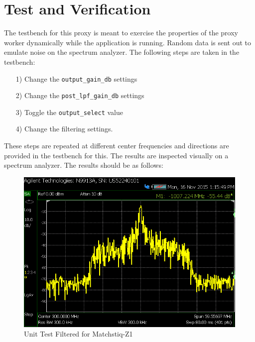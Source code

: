 \documentclass{article}
\begin{document}
\section*{Test and Verification}
\begin{flushleft}
	The testbench for this proxy is meant to exercise the properties of the proxy worker dynamically while the application is running.  Random data is sent out to emulate noise on the spectrum analyzer. The following steps are taken in the testbench:
	\begin{itemize}
		\item[1)] Change the \verb+output_gain_db+ settings
		\item[2)] Change the \verb+post_lpf_gain_db+ settings
		\item[3)] Toggle the \verb+output_select+ value
		\item[4)] Change the filtering settings.
	\end{itemize}
	These steps are repeated at different center frequencies and directions are provided in the testbench for this.  The results are inspected visually on a spectrum analyzer.  The results should be as follows:   \\
	\begin{figure}[ht]
		\centerline{\includegraphics[scale=0.7]{NoFilter}}
		\caption{Unit Test Filtered for Matchstiq-Z1}
		\label{fig:nofilt}
	\end{figure}
	\newpage


\end{flushleft}
\end{document}

